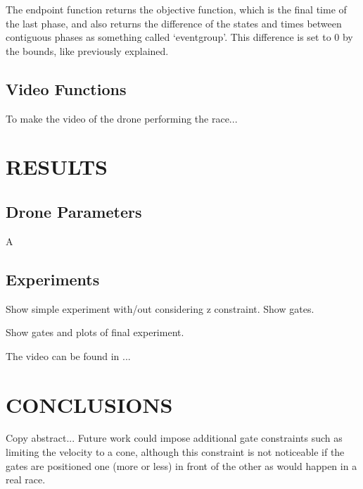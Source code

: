 \documentclass[letterpaper, 10 pt, conference]{ieeeconf}  %
\begin{document}
The endpoint function returns the objective function, which is the final time of the last phase, and also returns the difference of the states and times between contiguous phases as something called `eventgroup'. This difference is set to 0 by the bounds, like previously explained.

\subsection{Video Functions}

To make the video of the drone performing the race...


\section{RESULTS}\label{s:res}

\subsection{Drone Parameters}
A

\subsection{Experiments}

Show simple experiment with/out considering z constraint. Show gates.

Show gates and plots of final experiment.

The video can be found in ...

\section{CONCLUSIONS}\label{s:conclusions}

Copy abstract... Future work could impose additional gate constraints such as limiting the velocity to a cone, although this constraint is not noticeable if the gates are positioned one (more or less) in front of the other as would happen in a real race.

\addtolength{\textheight}{-12cm}   %
\end{document}
